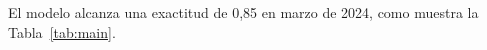 \label{sec:results}
El modelo alcanza una exactitud de 0,85 en marzo de 2024, como muestra la Tabla~\ref{tab:main}.
